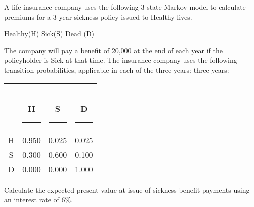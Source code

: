 A life insurance company uses the following 3-state Markov model to calculate premiums for a 3-year sickness policy issued to Healthy lives.
\begin{center} Healthy(H) \hspace{1in} Sick(S) \hspace{1in}Dead (D) \end{center}
The company will pay a benefit of 20,000 at the end of each year if the policyholder is Sick at that time.
The insurance company uses the following transition probabilities, applicable in each of the three years:
three years:
\begin{center}\begin{tabular}{c|ccc} & \rule{10pt}{0pt} H \rule{10pt}{0pt}& \rule{10pt}{0pt}S \rule{10pt}{0pt}& \rule{10pt}{0pt}D \rule{10pt}{0pt} \\ \hline
\rule{0pt}{14pt} H & 0.950 & 0.025 & 0.025  \\ 
S & 0.300 & 0.600 & 0.100 \\
D & 0.000 & 0.000 & 1.000
\end{tabular}\end{center}
Calculate the expected present value at issue of sickness benefit payments using an interest rate of 6\%.



